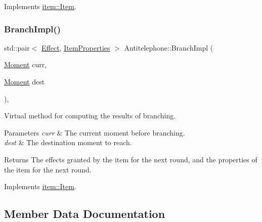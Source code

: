 Implements \hyperlink{classitem_1_1_item_a90df61c8a2a20144eb1100af5fb2d464}{item\+::\+Item}.

\mbox{\label{classitem_1_1_antitelephone_a1b094baeb7cae7e1161d1aa1650022d1}} 
\subsubsection{\texorpdfstring{Branch\+Impl()}{BranchImpl()}}
{\footnotesize\ttfamily std\+::pair$<$ \hyperlink{classitem_1_1_effect}{Effect}, \hyperlink{classitem_1_1_item_properties}{Item\+Properties} $>$ Antitelephone\+::\+Branch\+Impl (\begin{DoxyParamCaption}\item[{\hyperlink{classtimeplane_1_1_moment}{Moment}}]{curr,  }\item[{\hyperlink{classtimeplane_1_1_moment}{Moment}}]{dest }\end{DoxyParamCaption})\hspace{0.3cm}{\ttfamily [protected]}, {\ttfamily [virtual]}}



Virtual method for computing the results of branching. 


\begin{DoxyParams}{Parameters}
{\em curr} & The current moment before branching. \\
\hline
{\em dest} & The destination moment to reach. \\
\hline
\end{DoxyParams}
\begin{DoxyReturn}{Returns}
The effects granted by the item for the next round, and the properties of the item for the next round. 
\end{DoxyReturn}


Implements \hyperlink{classitem_1_1_item_afef6bdd5c1c734c67122e4118e9e1930}{item\+::\+Item}.



\subsection{Member Data Documentation}
\mbox{\label{classitem_1_1_antitelephone_ab6d34885da8ab27a578da87a0c746744}} 
